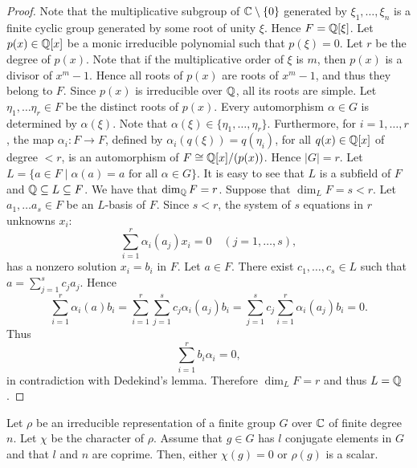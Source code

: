 \begin{proof}
    Note that the multiplicative subgroup of $\mathbb{C}\setminus\{0\}$ generated by $\xi_1,\dots,\xi_n$ is a finite cyclic group generated by some root of unity $\xi$. Hence $F=\mathbb{Q}[\xi]$. Let $p(x)\in \mathbb{Q}[x]$ be a monic irreducible polynomial such that $p(\xi)=0$.
    Let $r$ be the degree of $p(x)$. Note that if the multiplicative order of $\xi$ is $m$, then $p(x)$ is a divisor of $x^m-1$. Hence
    all roots of $p(x)$ are roots of $x^m-1$, and thus they belong to $F$. Since $p(x)$ is irreducible over $\mathbb{Q}$, all its roots are simple. Let $\eta_1,\dots \eta_r\in F$ be the distinct roots of $p(x)$. Every automorphism $\alpha\in G$ is determined by $\alpha(\xi)$. Note that $\alpha(\xi)\in \{ \eta_1,\dots ,\eta_r\}$. Furthermore, for $i=1,\dots ,r$, the map $\alpha_i\colon F\rightarrow F$, defined by $\alpha_i(q(\xi))=q(\eta_i)$, for all $q(x)\in\mathbb{Q}[x]$ of degree $<r$, is an automorphism of $F\cong \mathbb{Q}[x]/(p(x))$. Hence $|G|=r$. Let $L=\{ a\in F\mid \alpha(a)=a \mbox{ for all }\alpha\in G\}$. It is easy to see that $L$ is a subfield of $F$ and $\mathbb{Q}\subseteq L\subseteq F$. We have that $\dim_{\mathbb{Q}}F=r$. Suppose that $\dim_LF=s<r$. 
    Let $a_1,\dots a_s\in F$ be an $L$-basis of $F$. Since $s<r$, the system of $s$ equations in $r$ unknowns $x_i$:
    \[\sum_{i=1}^r\alpha_i(a_j)x_i=0\quad (j=1,\dots ,s),\]
    has a nonzero solution $x_i=b_i$ in $F$. Let $a\in F$. There exist $c_1,\dots, c_s\in L$ such that
    $a=\sum_{j=1}^sc_ja_j$. Hence
    \[ \sum_{i=1}^r\alpha_i(a)b_i=\sum_{i=1}^r\sum_{j=1}^sc_j\alpha_i(a_j)b_i=\sum_{j=1}^sc_j\sum_{i=1}^r\alpha_i(a_j)b_i=0.\]
    Thus
    \[\sum_{i=1}^rb_i\alpha_i=0,\]
    in contradiction with Dedekind's lemma. Therefore $\dim_LF=r$ and thus $L=\mathbb{Q}$.
\end{proof}

\begin{lemma}\label{Burnsidekey}
    Let $\rho$ be an irreducible representation of a finite group $G$ over $\mathbb{C}$ of finite degree $n$. Let $\chi$ be the character of $\rho$. Assume that $g\in G$ has $l$ conjugate elements in $G$ and that $l$ and $n$ are coprime. Then, either $\chi(g)=0$ or $\rho(g)$ is a scalar.
\end{lemma}


